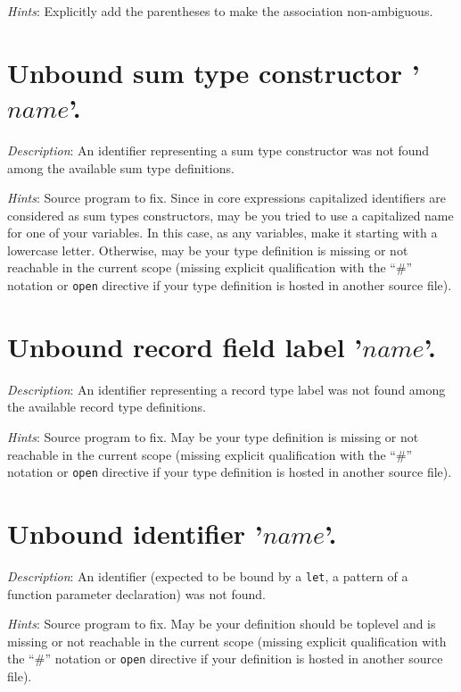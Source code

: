 {\em Hints}: Explicitly add the parentheses to make the association
non-ambiguous.



\section*{Unbound sum type constructor '$name$'.}
{\em Description}: An identifier representing a sum type constructor
was not found among the available sum type definitions.

{\em Hints}: Source program to fix. Since in core expressions
capitalized identifiers are considered as sum types constructors, may
be you tried to use a capitalized name for one of your variables. In
this case, as any variables, make it starting with a lowercase
letter. Otherwise, may be your type definition is missing or not
reachable in the current scope (missing explicit qualification with
the ``\#'' notation or {\tt open} directive if your type definition is
hosted in another source file).



\section*{Unbound record field label '$name$'.}
{\em Description}: An identifier representing a record type label
was not found among the available record type definitions.

{\em Hints}: Source program to fix. May be your type definition is
missing or not reachable in the current scope (missing explicit
qualification with the ``\#'' notation or {\tt open} directive if your
type definition is hosted in another source file).



\section*{Unbound identifier '$name$'.}
{\em Description}: An identifier (expected to be bound by a {\tt let},
a pattern of a function parameter declaration) was not found.

{\em Hints}: Source program to fix. May be your definition should be
toplevel and is missing or not reachable in the current scope (missing
explicit qualification with the ``\#'' notation or {\tt open}
directive if your definition is hosted in another source file).



